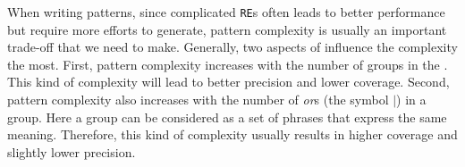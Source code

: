 When writing \RE patterns, since complicated \texttt{RE}s often leads to better performance but require more efforts to generate, pattern complexity is usually an important trade-off that we need to make. Generally, two aspects of \RE influence the complexity the most. First, pattern complexity increases with the number of groups in the \RE. This kind of complexity will lead to better precision and lower coverage. Second, pattern complexity also increases with the number of \emph{or}s (the symbol $|$) in a group. Here a group can be considered as a set of phrases that express the same meaning. Therefore, this kind of complexity usually results in higher coverage and slightly lower precision. 




